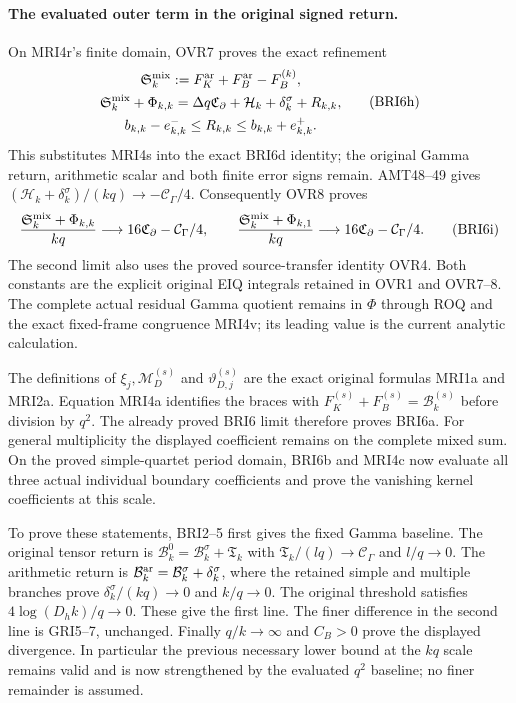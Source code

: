 \documentclass[11pt,a4paper]{article}
\begin{document}
\paragraph{The evaluated outer term in the original signed return.}
On MRI4r's finite domain, OVR7 proves the exact refinement
\[
 \begin{gathered}
 \mathfrak S_k^{\rm mix}
   :=F_K^{\rm ar}+F_B^{\rm ar}-F_B^{(k)},\\
 \mathfrak S_k^{\rm mix}+\Phi_{k,k}
   =\Delta q\mathfrak C_\partial+\mathcal H_k
                     +\delta_k^\sigma+R_{k,k},\\
 b_{k,k}-e_{k,k}^-\le R_{k,k}\le b_{k,k}+e_{k,k}^+.
 \end{gathered}\tag{BRI6h}
\]
This substitutes MRI4s into the exact BRI6d identity; the original
Gamma return, arithmetic scalar and both finite error signs remain.
AMT48--49 gives
$(\mathcal H_k+\delta_k^\sigma)/(kq)\to-\mathcal C_\Gamma/4$.
Consequently OVR8 proves
\[
 \frac{\mathfrak S_k^{\rm mix}+\Phi_{k,k}}{kq}
       \longrightarrow16\mathfrak C_\partial-\mathcal C_\Gamma/4,
 \qquad
 \frac{\mathfrak S_k^{\rm mix}+\Phi_{k,1}}{kq}
       \longrightarrow16\mathfrak C_\partial-\mathcal C_\Gamma/4.
 \tag{BRI6i}
\]
The second limit also uses the proved source-transfer identity OVR4.
Both constants are the explicit original EIQ integrals retained in
OVR1 and OVR7--8. The complete actual residual Gamma quotient remains
in $\Phi$ through ROQ and the exact fixed-frame congruence MRI4v;
its leading value is the current analytic calculation.


The definitions of $\xi_j,\mathcal M_D^{(s)}$ and
$\vartheta_{D,j}^{(s)}$ are the exact original formulas MRI1a
and MRI2a. Equation MRI4a identifies the braces with
$F_K^{(s)}+F_B^{(s)}=\mathcal B_k^{(s)}$ before division by
$q^2$. The already proved BRI6 limit therefore proves BRI6a.
For general multiplicity the displayed coefficient remains on the
complete mixed sum. On the proved simple-quartet period domain,
BRI6b and MRI4c now evaluate all three actual individual boundary
coefficients and prove the vanishing kernel coefficients at this scale.

To prove these statements, BRI2--5 first gives the fixed Gamma
baseline. The original tensor return is
$\mathcal B_k^0=\mathcal B_k^\sigma+\mathfrak T_k$ with
$\mathfrak T_k/(lq)\to\mathcal C_\Gamma$ and $l/q\to0$.
The arithmetic return is
$\mathcal B_k^{\rm ar}=\mathcal B_k^\sigma+\delta_k^\sigma$,
where the retained simple and multiple branches prove
$\delta_k^\sigma/(kq)\to0$ and $k/q\to0$.
The original threshold satisfies $4\log(D_hk)/q\to0$.
These give the first line. The finer difference in the second line
is GRI5--7, unchanged. Finally $q/k\to\infty$ and $C_B>0$
prove the displayed divergence. In particular the previous necessary
lower bound at the $kq$ scale remains valid and is now strengthened
by the evaluated $q^2$ baseline; no finer remainder is assumed.
\end{document}

